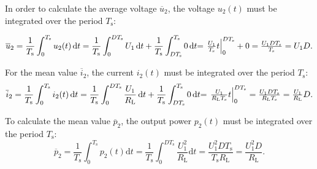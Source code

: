 \begin{solutionblock}
	In order to calculate the average voltage $\overline u_2$, the voltage $u_{\mathrm{2}}(t)$ must be integrated over the period $T_{\mathrm{s}}$:

	\begin{equation}
		\overline u_2 = \frac{1}{T_{\mathrm{s}}} \int_0^{ T_{\mathrm{s}}} u_2 (t) \, \mathrm{d}t = \frac{1}{ T_{\mathrm{s}}} \int_0^{D T_{\mathrm{s}}} U_1 \, \mathrm{d}t + \frac{1}{ T_{\mathrm{s}}} \int_{D  T_{\mathrm{s}}}^{ T_{\mathrm{s}}} 0 \, \mathrm{d}t$$
		$$= \left . \frac{U_1}{ T_{\mathrm{s}}} t \right |_0^{D  T_{\mathrm{s}}}  + 0 = \frac{U_1 D  T_{\mathrm{s}}}{ T_{\mathrm{s}}} = U_1 D.
	\end{equation}

	For the mean value $\overline i_2$, the current $i_{\mathrm{2}}(t)$ must be integrated over the period $T_{\mathrm{s}}$:
	\begin{equation}
		\overline i_2 = \frac{1}{ T_{\mathrm{s}}} \int_0^{ T_{\mathrm{s}}} i_2(t) \, \mathrm{d}t = \frac{1}{ T_{\mathrm{s}}}\int_0^{D  T_{\mathrm{s}}} \frac{U_1}{ R_{\mathrm{L}}} \, \mathrm{d}t + \frac{1}{ T_{\mathrm{s}}}\int_{D  T_{\mathrm{s}}}^{ T_{\mathrm{s}}} 0 \, \mathrm{d}t$$
		$$= \left . \frac{U_1}{ R_{\mathrm{L}}  T_{\mathrm{s}}}  t \right |_0^{D  T_{\mathrm{s}}} = \frac{U_1 D  T_{\mathrm{s}}}{ R_{\mathrm{L}}  T_{\mathrm{s}}} = \frac{U_1}{ R_{\mathrm{L}}} D.
	\end{equation}

	To calculate the mean value $\overline{p}_{\mathrm{2}}$, the output power $p_2(t)$ must be integrated over the period $T_{\mathrm{s}}$:
	\begin{equation}
		\overline{p}_{\mathrm{2}} = \frac{1}{T_{\mathrm{s}}} \int_0^{T_{\mathrm{s}}} p_2(t) \mathrm{d}t = \frac{1}{T_{\mathrm{s}}} \int_0^{D T_{\mathrm{s}}} \frac{U_1^2}{ R_{\mathrm{L}}} \mathrm{d}t = \frac{U_1^2 D T_{\mathrm{s}}}{ T_{\mathrm{s}}  R_{\mathrm{L}}} = \frac{U_1^2 D}{ R_{\mathrm{L}}}.
	\end{equation}
\end{solutionblock}


